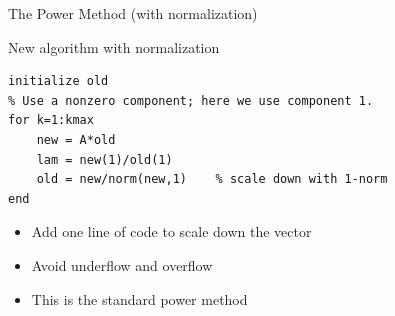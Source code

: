 \documentclass[10pt]{beamer}
\begin{document}
\begin{frame}[fragile]{The Power Method (with normalization)}

New algorithm with normalization
\begin{lstlisting}[mathescape]
initialize old
% Use a nonzero component; here we use component 1.
for k=1:kmax
    new = A*old   
    lam = new(1)/old(1)   
    old = new/norm(new,1)    % scale down with 1-norm
end
\end{lstlisting}
\vspace{6mm}
\begin{itemize}
    \item Add one line of code to scale down the vector
    \item Avoid underflow and overflow 
    \item This is the standard power method
\end{itemize}
\end{frame}
\end{document}
